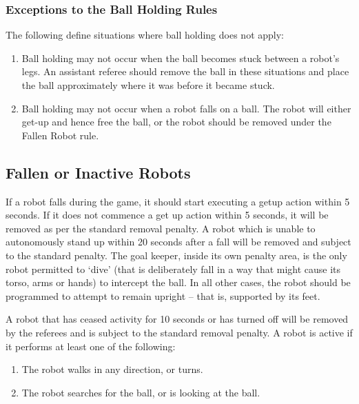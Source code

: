\documentclass[12pt]{article}
\begin{document}
\subsubsection{Exceptions to the Ball Holding Rules}
\label{sec:situations_no_ball_holding}

The following define situations where ball holding does not apply:

\begin{enumerate}
	\item Ball holding may not occur when the ball becomes stuck between a robot's legs.  An assistant referee should remove the ball in these situations and place the ball approximately where it was before it became stuck.
	\item Ball holding may not occur when a robot falls on a ball.  The robot will either get-up and hence free the ball, or the robot should be removed under the Fallen Robot rule.
\end{enumerate}


\subsection{Fallen or Inactive Robots}
\label{sec:fallenrobots}

If a robot falls during the game, it should start executing a getup action within 5 seconds. If it does not commence a get up action within 5 seconds, it will be removed as per the standard removal penalty. A robot which is unable to autonomously stand up within 20 seconds after a fall will be removed and subject to the standard penalty. The goal keeper, inside its own penalty area, is the only robot permitted to `dive' (that is deliberately fall in a way that might cause its torso, arms or hands) to intercept the ball. In all other cases, the robot should be programmed to attempt to remain upright -- that is, supported by its feet.

A robot that has ceased activity for 10 seconds or has turned off will be removed by the referees and is subject to the standard removal penalty. A robot is active if it performs at least one of the following:

\begin{enumerate}

\item The robot walks in any direction, or turns.

\item The robot searches for the ball, or is looking at the ball.

\end{enumerate}
\end{document}
